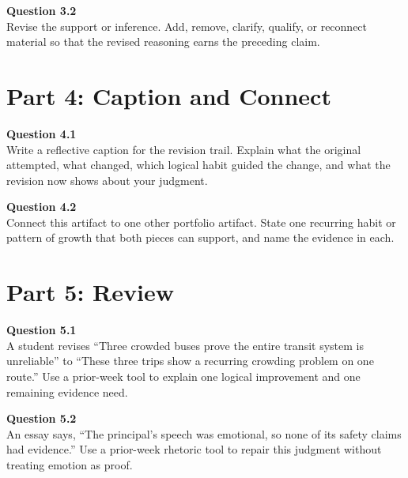 \documentclass[12pt]{article}
\begin{document}
\textbf{Question 3.2}\\[-0.15em]
Revise the support or inference. Add, remove, clarify, qualify, or reconnect material so that the revised reasoning earns the preceding claim.

\newpage
\section*{Part 4: Caption and Connect}
\textbf{Question 4.1}\\[-0.15em]
Write a reflective caption for the revision trail. Explain what the original attempted, what changed, which logical habit guided the change, and what the revision now shows about your judgment.

\textbf{Question 4.2}\\[-0.15em]
Connect this artifact to one other portfolio artifact. State one recurring habit or pattern of growth that both pieces can support, and name the evidence in each.

\newpage
\section*{Part 5: Review}
\textbf{Question 5.1}\\[-0.15em]
A student revises ``Three crowded buses prove the entire transit system is unreliable'' to ``These three trips show a recurring crowding problem on one route.'' Use a prior-week tool to explain one logical improvement and one remaining evidence need.

\textbf{Question 5.2}\\[-0.15em]
An essay says, ``The principal's speech was emotional, so none of its safety claims had evidence.'' Use a prior-week rhetoric tool to repair this judgment without treating emotion as proof.
\end{document}
